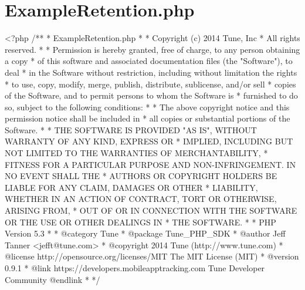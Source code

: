 \hypertarget{ExampleRetention_8php-example}{\section{Example\-Retention.\-php}
}

\begin{DoxyCodeInclude}
<?php\textcolor{comment}{}
\textcolor{comment}{/**}
\textcolor{comment}{ * ExampleRetention.php}
\textcolor{comment}{ *}
\textcolor{comment}{ * Copyright (c) 2014 Tune, Inc}
\textcolor{comment}{ * All rights reserved.}
\textcolor{comment}{ *}
\textcolor{comment}{ * Permission is hereby granted, free of charge, to any person obtaining a copy}
\textcolor{comment}{ * of this software and associated documentation files (the "Software"), to deal}
\textcolor{comment}{ * in the Software without restriction, including without limitation the rights}
\textcolor{comment}{ * to use, copy, modify, merge, publish, distribute, sublicense, and/or sell}
\textcolor{comment}{ * copies of the Software, and to permit persons to whom the Software is}
\textcolor{comment}{ * furnished to do so, subject to the following conditions:}
\textcolor{comment}{ *}
\textcolor{comment}{ * The above copyright notice and this permission notice shall be included in}
\textcolor{comment}{ * all copies or substantial portions of the Software.}
\textcolor{comment}{ *}
\textcolor{comment}{ * THE SOFTWARE IS PROVIDED "AS IS", WITHOUT WARRANTY OF ANY KIND, EXPRESS OR}
\textcolor{comment}{ * IMPLIED, INCLUDING BUT NOT LIMITED TO THE WARRANTIES OF MERCHANTABILITY,}
\textcolor{comment}{ * FITNESS FOR A PARTICULAR PURPOSE AND NON-INFRINGEMENT. IN NO EVENT SHALL THE}
\textcolor{comment}{ * AUTHORS OR COPYRIGHT HOLDERS BE LIABLE FOR ANY CLAIM, DAMAGES OR OTHER}
\textcolor{comment}{ * LIABILITY, WHETHER IN AN ACTION OF CONTRACT, TORT OR OTHERWISE, ARISING FROM,}
\textcolor{comment}{ * OUT OF OR IN CONNECTION WITH THE SOFTWARE OR THE USE OR OTHER DEALINGS IN}
\textcolor{comment}{ * THE SOFTWARE.}
\textcolor{comment}{ *}
\textcolor{comment}{ * PHP Version 5.3}
\textcolor{comment}{ *}
\textcolor{comment}{ * @category  Tune}
\textcolor{comment}{ * @package   Tune\_PHP\_SDK}
\textcolor{comment}{ * @author    Jeff Tanner <jefft@tune.com>}
\textcolor{comment}{ * @copyright 2014 Tune (http://www.tune.com)}
\textcolor{comment}{ * @license   http://opensource.org/licenses/MIT The MIT License (MIT)}
\textcolor{comment}{ * @version   0.9.1}
\textcolor{comment}{ * @link      https://developers.mobileapptracking.com Tune Developer Community @endlink}
\textcolor{comment}{ *}
\textcolor{comment}{ */}


\end{DoxyCodeInclude}
